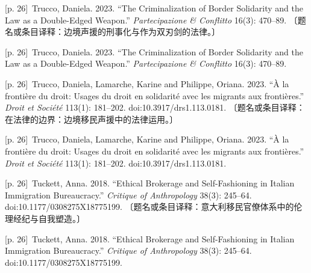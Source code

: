 \documentclass[10pt,a4paper]{article}
\begin{document}
\noindent\begin{minipage}{\textwidth}\begin{minipage}[t]{\dimexpr.5\textwidth-4mm\relax}{\scriptsize\color{gray} [p. 26]}\ Trucco, Daniela. 2023. “The Criminalization of Border Solidarity and the Law as a Double-Edged Weapon.” \textit{Partecipazione \& Conflitto} 16(3): 470–89. 〔题名或条目译释：边境声援的刑事化与作为双刃剑的法律。〕\par\end{minipage}\hfill\begin{minipage}[t]{\dimexpr.5\textwidth-4mm\relax}{\scriptsize\color{gray} [p. 26]}\ Trucco, Daniela. 2023. “The Criminalization of Border Solidarity and the Law as a Double-Edged Weapon.” \textit{Partecipazione \& Conflitto} 16(3): 470–89.\par\end{minipage}\end{minipage}\par
\noindent\begin{minipage}{\textwidth}\begin{minipage}[t]{\dimexpr.5\textwidth-4mm\relax}{\scriptsize\color{gray} [p. 26]}\ Trucco, Daniela, Lamarche, Karine and Philippe, Oriana. 2023. “À la frontière du droit: Usages du droit en solidarité avec les migrants aux frontières.” \textit{Droit et Société} 113(1): 181–202. doi:10.3917/drs1.113.0181. 〔题名或条目译释：在法律的边界：边境移民声援中的法律运用。〕\par\end{minipage}\hfill\begin{minipage}[t]{\dimexpr.5\textwidth-4mm\relax}{\scriptsize\color{gray} [p. 26]}\ Trucco, Daniela, Lamarche, Karine and Philippe, Oriana. 2023. “À la frontière du droit: Usages du droit en solidarité avec les migrants aux frontières.” \textit{Droit et Société} 113(1): 181–202. doi:10.3917/drs1.113.0181.\par\end{minipage}\end{minipage}\par
\noindent\begin{minipage}{\textwidth}\begin{minipage}[t]{\dimexpr.5\textwidth-4mm\relax}{\scriptsize\color{gray} [p. 26]}\ Tuckett, Anna. 2018. “Ethical Brokerage and Self-Fashioning in Italian Immigration Bureaucracy.” \textit{Critique of Anthropology} 38(3): 245–64. doi:10.1177/0308275X18775199. 〔题名或条目译释：意大利移民官僚体系中的伦理经纪与自我塑造。〕\par\end{minipage}\hfill\begin{minipage}[t]{\dimexpr.5\textwidth-4mm\relax}{\scriptsize\color{gray} [p. 26]}\ Tuckett, Anna. 2018. “Ethical Brokerage and Self-Fashioning in Italian Immigration Bureaucracy.” \textit{Critique of Anthropology} 38(3): 245–64. doi:10.1177/0308275X18775199.\par\end{minipage}\end{minipage}\par
\end{document}
